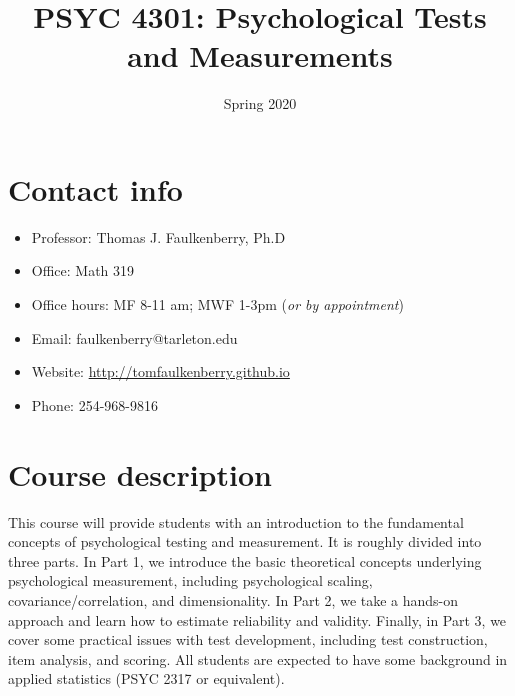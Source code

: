\documentclass[10pt]{article}
\date{Spring 2020}
\title{PSYC 4301: Psychological Tests and Measurements}
\begin{document}
\maketitle

\section*{Contact info}
\label{sec:org0d19164}
\begin{itemize}
\item Professor: Thomas J. Faulkenberry, Ph.D
\item Office: Math 319
\item Office hours: MF 8-11 am; MWF 1-3pm (\emph{or by appointment})
\item Email: faulkenberry@tarleton.edu
\item Website: \url{http://tomfaulkenberry.github.io}
\item Phone: 254-968-9816
\end{itemize}

\section*{Course description}
\label{sec:org8a43174}

This course will provide students with an introduction to the fundamental concepts of psychological testing and measurement. It is roughly divided into three parts. In Part 1, we introduce the basic theoretical concepts underlying psychological measurement, including psychological scaling, covariance/correlation, and dimensionality. In Part 2, we take a hands-on approach and learn how to estimate reliability and validity. Finally, in Part 3, we cover some practical issues with test development, including test construction, item analysis, and scoring. All students are expected to have some background in applied statistics (PSYC 2317 or equivalent). 
\end{document}
